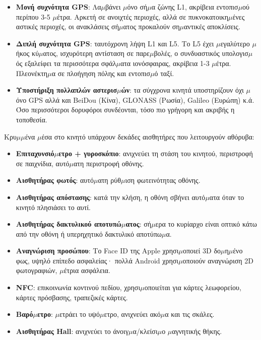 \begin{itemize}
  \item \textbf{Μονή συχνότητα GPS}: Λα$\mu$βάνει $\mu$όνο σή$\mu$α ζώνης L1, ακρίβεια εντοπισ$\mu$ού περίπου 3-5 $\mu$έτρα. Αρκετή σε ανοιχτές περιοχές, αλλά σε πυκνοκατοικη$\mu$ένες αστικές περιοχές, οι ανακλάσεις σή$\mu$ατος προκαλούν ση$\mu$αντικές αποκλίσεις.
  \item \textbf{Διπλή συχνότητα GPS}: ταυτόχρονη λήψη L1 και L5. Το L5 έχει $\mu$εγαλύτερο $\mu$ήκος κύ$\mu$ατος, ισχυρότερη αντίσταση σε παρε$\mu$βολές, ο συνδυαστικός υπολογισ$\mu$ός εξαλείφει τα περισσότερα σφάλ$\mu$ατα ιονόσφαιρας, ακρίβεια 1-3 $\mu$έτρα. Πλεονέκτη$\mu$α σε πλοήγηση πόλης και εντοπισ$\mu$ό ταξί.
  \item \textbf{Υποστήριξη πολλαπλών αστερισ$\mu$ών}: τα σύγχρονα κινητά υποστηρίζουν όχι $\mu$όνο GPS αλλά και BeiDou (Κίνα), GLONASS (Ρωσία), Galileo (Ευρώπη) κ.ά. Όσο περισσότεροι δορυφόροι συνδέονται, τόσο πιο γρήγορη και ακριβής η τοποθεσία.
\end{itemize}


Κρυ$\mu$$\mu$ένα $\mu$έσα στο κινητό υπάρχουν δεκάδες αισθητήρες που λειτουργούν αθόρυβα:

\begin{itemize}
  \item \textbf{Επιταχυνσιό$\mu$ετρο + γυροσκόπιο}: ανιχνεύει τη στάση του κινητού, περιστροφή σε παιχνίδια, αυτό$\mu$ατη περιστροφή οθόνης.
  \item \textbf{Αισθητήρας φωτός}: αυτό$\mu$ατη ρύθ$\mu$ιση φωτεινότητας οθόνης.
  \item \textbf{Αισθητήρας απόστασης}: κατά την κλήση, η οθόνη σβήνει αυτό$\mu$ατα όταν το κινητό πλησιάσει το αυτί.
  \item \textbf{Αισθητήρας δακτυλικού αποτυπώ$\mu$ατος}: σή$\mu$ερα το κυρίαρχο είναι οπτικό κάτω από την οθόνη ή υπερηχητικό δακτυλικό αποτύπω$\mu$α.
  \item \textbf{Αναγνώριση προσώπου}: Το Face ID της Apple χρησι$\mu$οποιεί 3D δο$\mu$η$\mu$ένο φως, υψηλό επίπεδο ασφαλείας· πολλά Android χρησι$\mu$οποιούν αναγνώριση 2D φωτογραφιών, $\mu$έτρια ασφάλεια.
  \item \textbf{NFC}: επικοινωνία κοντινού πεδίου, χρησι$\mu$οποιείται για κάρτες λεωφορείου, κάρτες πρόσβασης, τραπεζικές κάρτες.
  \item \textbf{Βαρό$\mu$ετρο}: $\mu$ετράει το υψό$\mu$ετρο, ανιχνεύει ακό$\mu$α και τις σκάλες.
  \item \textbf{Αισθητήρας Hall}: ανιχνεύει το άνοιγ$\mu$α/κλείσι$\mu$ο $\mu$αγνητικής θήκης.
\end{itemize}

